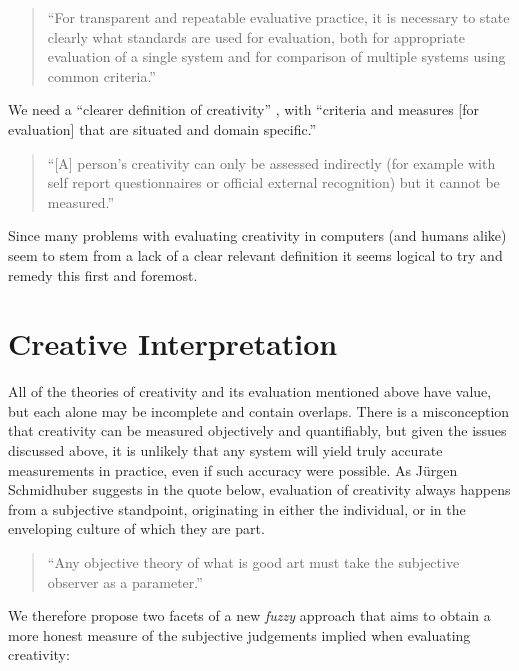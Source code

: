 \begin{quotation}
  ``For transparent and repeatable evaluative practice, it is necessary to state clearly what standards are used for evaluation, both for appropriate evaluation of a single system and for comparison of multiple systems using common criteria.'' 
\end{quotation}

We need a ``clearer definition of creativity'' \autocite[p.459]{Mayer1999}, with ``criteria and measures [for evaluation] that are situated and domain specific.'' \autocite[p.7]{Candy2012}

\begin{quotation}
  ``[A] person's creativity can only be assessed indirectly (for example with self report questionnaires or official external recognition) but it cannot be measured.'' 
\end{quotation}

Since many problems with evaluating creativity in computers (and humans alike) seem to stem from a lack of a clear relevant definition it seems logical to try and remedy this first and foremost.


\section{Creative Interpretation}

All of the theories of creativity and its evaluation mentioned above have value, but each alone may be incomplete and contain overlaps. There is a misconception that creativity can be measured objectively and quantifiably, but given the issues discussed above, it is unlikely that any system will yield truly accurate measurements in practice, even if such accuracy were possible. As J{\"u}rgen Schmidhuber suggests in the quote below, evaluation of creativity always happens from a subjective standpoint, originating in either the individual, or in the enveloping culture of which they are part.

\begin{quote}
  ``Any objective theory of what is good art must take the subjective observer as a parameter.'' \autocite{Schmidhuber2006}
\end{quote}

We therefore propose two facets of a new \textit{fuzzy} approach that aims to obtain a more honest measure of the subjective judgements implied when evaluating creativity:

